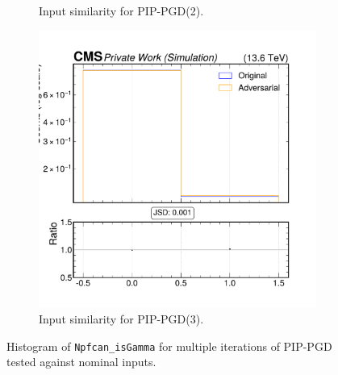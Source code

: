 \begin{figure}[htbp]
\begin{subfigure}[t]{0.32\textwidth}
    \caption*{Input similarity for PIP-PGD(2).}
  \end{subfigure}\hfill
  \begin{subfigure}[t]{0.32\textwidth}
    \includegraphics[width=\linewidth]{media/output/features/compare/combined_it_3/cmp_npf_arr_Npfcan_isGamma.pdf}
    \caption*{Input similarity for PIP-PGD(3).}
  \end{subfigure}

  \caption*{Histogram of \texttt{Npfcan\_isGamma} for multiple iterations of PIP-PGD tested against nominal inputs.}
  \label{fig:combined_input_Npfcan_isGamma}
\end{figure}

